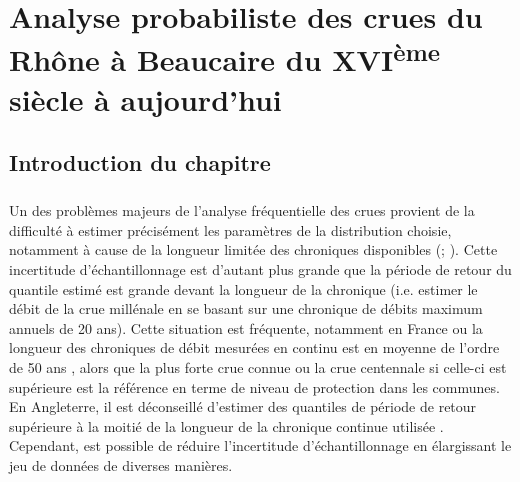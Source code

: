 % 
%
%
%
%

\chapter{Analyse probabiliste des crues du Rhône à Beaucaire du XVI\textsuperscript{ème} siècle à aujourd'hui}

\section{Introduction du chapitre}

	\paragraph{} Un des problèmes majeurs de l'analyse fréquentielle des crues provient de la difficulté à estimer précisément les paramètres de la distribution choisie, notamment à cause de la longueur limitée des chroniques disponibles (\citet{kjeldsen_uncertainty_2011}; \citet{apel_flood_2004}). Cette incertitude d'échantillonnage est d'autant plus grande que la période de retour du quantile estimé est grande devant la longueur de la chronique (i.e. estimer le débit de la crue millénale en se basant sur une chronique de débits maximum annuels de 20 ans). Cette situation est fréquente, notamment en France ou la longueur des chroniques de débit mesurées en continu est en moyenne de l'ordre de 50 ans \citep{le_coz_quantifying_2017}, alors que la plus forte crue connue ou la crue centennale si celle-ci est supérieure est la référence en terme de niveau de protection dans les communes. En Angleterre, il est déconseillé d'estimer des quantiles de période de retour supérieure à la moitié de la longueur de la chronique continue utilisée \citep{whs_flood_2008}. Cependant, est possible de réduire l'incertitude d'échantillonnage en élargissant le jeu de données de diverses manières.
	 

